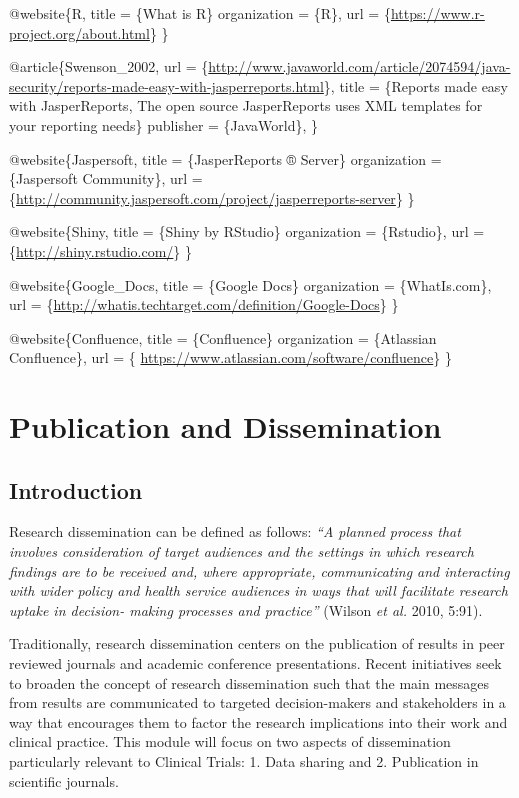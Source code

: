 \documentclass[]{book}
\theoremstyle{definition}
\theoremstyle{definition}
\theoremstyle{definition}
\theoremstyle{remark}
\begin{document}
@website\{R, title = \{What is R\} organization = \{R\}, url =
\{\url{https://www.r-project.org/about.html}\} \}

@article\{Swenson\_2002, url =
\{\url{http://www.javaworld.com/article/2074594/java-security/reports-made-easy-with-jasperreports.html}\},
title = \{Reports made easy with JasperReports, The open source
JasperReports uses XML templates for your reporting needs\} publisher =
\{JavaWorld\}, \}

@website\{Jaspersoft, title = \{JasperReports ® Server\} organization =
\{Jaspersoft Community\}, url =
\{\url{http://community.jaspersoft.com/project/jasperreports-server}\}
\}

@website\{Shiny, title = \{Shiny by RStudio\} organization =
\{Rstudio\}, url = \{\url{http://shiny.rstudio.com/}\} \}

@website\{Google\_Docs, title = \{Google Docs\} organization =
\{WhatIs.com\}, url =
\{\url{http://whatis.techtarget.com/definition/Google-Docs}\} \}

@website\{Confluence, title = \{Confluence\} organization = \{Atlassian
Confluence\}, url = \{
\url{https://www.atlassian.com/software/confluence}\} \}

\chapter{Publication and
Dissemination}\label{publication-and-dissemination}

\section{Introduction}\label{introduction-3}

Research dissemination can be defined as follows: \emph{``A planned
process that involves consideration of target audiences and the settings
in which research findings are to be received and, where appropriate,
communicating and interacting with wider policy and health service
audiences in ways that will facilitate research uptake in decision-
making processes and practice''} (Wilson \emph{et al.} 2010, 5:91).

Traditionally, research dissemination centers on the publication of
results in peer reviewed journals and academic conference presentations.
Recent initiatives seek to broaden the concept of research dissemination
such that the main messages from results are communicated to targeted
decision-makers and stakeholders in a way that encourages them to factor
the research implications into their work and clinical practice. This
module will focus on two aspects of dissemination particularly relevant
to Clinical Trials: 1. Data sharing and 2. Publication in scientific
journals.
\end{document}
